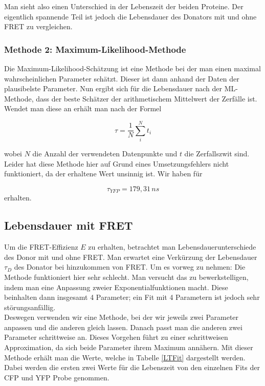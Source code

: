 Man sieht also einen Unterschied in der Lebenszeit der beiden Proteine. Der eigentlich spannende Teil 
ist jedoch die Lebensdauer des Donators mit und ohne FRET zu vergleichen.

\subsubsection{Methode 2: Maximum-Likelihood-Methode}

Die Maximum-Likelihood-Schätzung \cite[S.176]{Stahel2000} ist eine Methode bei der man einen maximal wahrscheinlichen Parameter schätzt.
Dieser ist dann anhand der Daten der plausibelste Parameter. Nun ergibt sich für die Lebensdauer nach der
ML-Methode, dass der beste Schätzer der arithmetischem Mittelwert der Zerfälle ist.
Wendet man diese an erhält man nach der Formel

\begin{equation}
    \tau = \frac{1}{N} \sum_i^N t_i
\end{equation}

wobei $N$ die Anzahl der verwendeten Datenpunkte und $t$ die Zerfallszwit sind. Leider hat diese Methode hier auf Grund 
eines Umsetzungsfehlers nicht funktioniert, da der erhaltene Wert unsinnig ist. Wir haben für 

\begin{equation*}
    \tau_{YFP} = 179,31\,ns
\end{equation*}
erhalten. 



\subsection{Lebensdauer mit FRET}

Um die FRET-Effizienz $E$ zu erhalten, betrachtet man Lebensdauerunterschiede des Donor mit und ohne FRET. 
Man erwartet eine Verkürzung der Lebensdauer $\tau_D$ des Donator bei hinzukommen von FRET. Um es vorweg zu nehmen: Die Methode funktioniert hier sehr schlecht. 
Man versucht das zu bewerkstelligen, indem man eine Anpassung zweier Exponentialfunktionen macht. Diese beinhalten dann insgesamt 4 Parameter; 
ein Fit mit 4 Parametern ist jedoch sehr störungsanfällig.\\

Deswegen verwenden wir eine Methode, bei der wir jeweils zwei Parameter anpassen und die anderen gleich lassen. Danach passt man die anderen zwei 
Parameter schrittweise an. Dieses Vorgehen führt zu einer schrittweisen Approximation, da sich beide Parameter ihrem Maximum annähern. Mit dieser 
Methode erhält man die Werte, welche in Tabelle \ref{LTFit} dargestellt werden. Dabei werden die ersten zwei Werte für die Lebenszeit von den einzelnen Fits der CFP und YFP Probe genommen.\\

